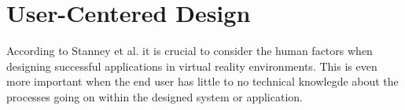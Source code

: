 \section{User-Centered Design}
According to Stanney et al. it is crucial to consider the human factors when designing successful applications in virtual reality environments. This is even more important when the end user has little to no technical knowlegde about the processes going on within the designed system or application.
\cite{UCD:stanney1998human}
